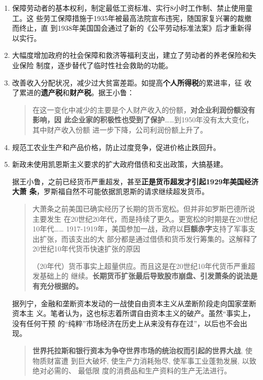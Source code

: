 \begin{enumerate}
\item 保障劳动者的基本权利，制定最低工资标准、实行8小时工作制、禁止使用童工。这
  些劳工保障措施于1935年被最高法院宣布违宪，随国家复兴署的裁撤而终止，直
  到1938年美国国会通过了新的《公平劳动标准法案》后才重新得以实行。

\item 大幅度增加政府的社会保障和救济等福利支出，建立了劳动者的养老保险和失业保险
  制度，逐步替代了临时性社会救助的功能。

\item 改善收入分配状况，减少过大贫富差距。如提高\textbf{个人所得税}的累进率，征
  收了累进的\textbf{遗产税}和\textbf{财产税}。据王小鲁：
  \begin{quotation}
    在这一变化中减少的主要是个人财产收入的份额，\textbf{对企业利润份额没有影响，因
      此企业家的积极性也受到了保护}……到1950年没有太大变化，其中财产收入份额
    进一步下降，公司利润份额上升了。
\end{quotation}

\item 规范工农业生产和产品价格，防止过度竞争，促进价格止跌回升。

\item 新政未使用凯恩斯主义要求的扩大政府借债和支出政策，大搞基建。

  据王小鲁，之前已经货币严重超发，甚至\textbf{正是货币超发才引起1929年美国经济大萧
    条}，罗斯福自然不可能依据凯恩斯的请求继续超发货币。
  \begin{quotation}
    大萧条之前美国已确实经历了长期的货币宽松。但并非如罗斯巴德所说主要发生
    在20世纪20年代，而是持续了更久。更宽松的时期是在20世纪10年代……
    1917-1919年，美国参加一战，政府以\textbf{巨额赤字}支持了军事支出扩张，而该支出的大
    部分都是通过借债和货币发行筹集的。这解释了20世纪10年代货币快速扩张的原因

    （20年代）货币事实上超量供应。而且这是在20世纪10年代货币严重超发基础上的
    继续。\textbf{长期货币扩张最后导致股市崩盘、引发萧条的说法是有充分根据的。}
  \end{quotation}

  据列宁，金融和垄断资本发动的一战使自由资本主义从垄断阶段走向国家垄断资本主
  义。笔者认为，这也标志着所谓自由资本主义的破产。虽然“事实上，没有任何干预
  的“纯粹”市场经济在历史上从来没有存在过”，以后也不会出现。
  \begin{quotation}
    \textbf{世界托拉斯和银行资本为争夺世界市场的统治权而引起的世界大战}, 使物质财富遭
    到巨大破坏, 使生产力消耗殆尽, 使军事工业蓬勃发展, 以致绝对必需的、 最低限
    度的消费品和生产资料的生产无法进行。


\end{quotation}
\end{enumerate}
